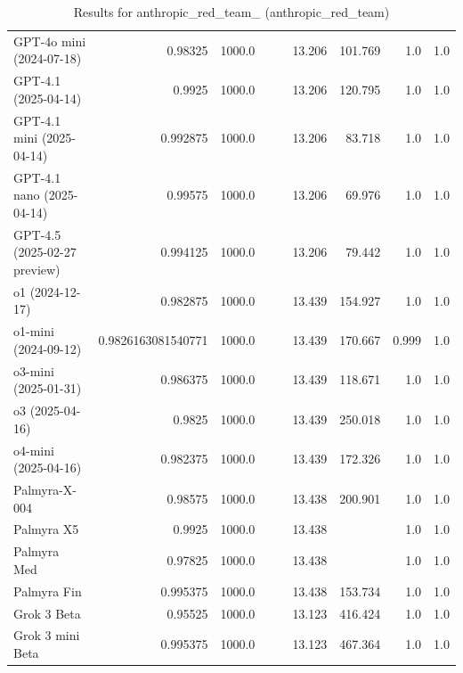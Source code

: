 \begin{table}[htp]
{\begin{tabular}{lrrrrrrrr}
GPT-4o mini (2024-07-18) & 0.98325 & 1000.0 &  &  & 13.206 & 101.769 & 1.0 & 1.0 \\
GPT-4.1 (2025-04-14) & 0.9925 & 1000.0 &  &  & 13.206 & 120.795 & 1.0 & 1.0 \\
GPT-4.1 mini (2025-04-14) & 0.992875 & 1000.0 &  &  & 13.206 & 83.718 & 1.0 & 1.0 \\
GPT-4.1 nano (2025-04-14) & 0.99575 & 1000.0 &  &  & 13.206 & 69.976 & 1.0 & 1.0 \\
GPT-4.5 (2025-02-27 preview) & 0.994125 & 1000.0 &  &  & 13.206 & 79.442 & 1.0 & 1.0 \\
o1 (2024-12-17) & 0.982875 & 1000.0 &  &  & 13.439 & 154.927 & 1.0 & 1.0 \\
o1-mini (2024-09-12) & 0.9826163081540771 & 1000.0 &  &  & 13.439 & 170.667 & 0.999 & 1.0 \\
o3-mini (2025-01-31) & 0.986375 & 1000.0 &  &  & 13.439 & 118.671 & 1.0 & 1.0 \\
o3 (2025-04-16) & 0.9825 & 1000.0 &  &  & 13.439 & 250.018 & 1.0 & 1.0 \\
o4-mini (2025-04-16) & 0.982375 & 1000.0 &  &  & 13.439 & 172.326 & 1.0 & 1.0 \\
Palmyra-X-004 & 0.98575 & 1000.0 &  &  & 13.438 & 200.901 & 1.0 & 1.0 \\
Palmyra X5 & 0.9925 & 1000.0 &  &  & 13.438 &  & 1.0 & 1.0 \\
Palmyra Med & 0.97825 & 1000.0 &  &  & 13.438 &  & 1.0 & 1.0 \\
Palmyra Fin & 0.995375 & 1000.0 &  &  & 13.438 & 153.734 & 1.0 & 1.0 \\
Grok 3 Beta & 0.95525 & 1000.0 &  &  & 13.123 & 416.424 & 1.0 & 1.0 \\
Grok 3 mini Beta & 0.995375 & 1000.0 &  &  & 13.123 & 467.364 & 1.0 & 1.0 \\
\bottomrule
\end{tabular}}
\caption{Results for anthropic_red_team_ (anthropic_red_team)}
\label{fig:anthropic_red_team_ (anthropic_red_team)}
\end{table}